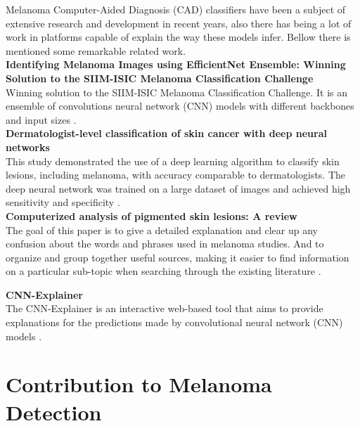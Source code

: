 Melanoma Computer-Aided Diagnosis (CAD) classifiers have been a subject of extensive research and development in recent years, also there has being a lot of work in platforms capable of explain the way these models infer. Bellow there is mentioned some remarkable related work. \\

\vspace{0.5cm}
\textbf{Identifying Melanoma Images using EfficientNet Ensemble: Winning Solution to the SIIM-ISIC Melanoma Classification Challenge} \\

Winning solution to the SIIM-ISIC Melanoma Classification Challenge. It is an ensemble of convolutions neural network (CNN) models with different backbones and input sizes \cite{WinningISIC}.  \\

\vspace{0.5cm}
\textbf{Dermatologist-level classification of skin cancer with deep neural networks} \\

This study demonstrated the use of a deep learning algorithm to classify skin lesions, including melanoma, with accuracy comparable to dermatologists. The deep neural network was trained on a large dataset of images and achieved high sensitivity and specificity \cite{SkinCancerDeepNN}. \\

\vspace{0.5cm}
\textbf{Computerized analysis of pigmented skin lesions: A review}  \\

The goal of this paper is to give a detailed explanation and clear up any confusion about the words and phrases used in melanoma studies. And to organize and group together useful sources, making it easier to find information on a particular sub-topic when searching through the existing literature \cite{MelanomaTopicsReview}. \\

\newpage

\vspace{0.5cm}
\textbf{CNN-Explainer} \\

The CNN-Explainer is an interactive web-based tool that aims to provide explanations for the predictions made by convolutional neural network (CNN) models \cite{CNNExplainer}.

\section{Contribution to Melanoma Detection}

